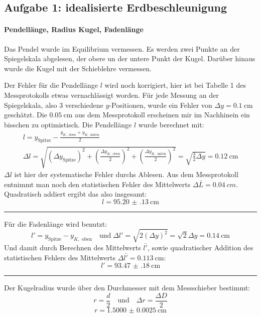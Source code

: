 
\subsection{Aufgabe 1: idealisierte Erdbeschleunigung}
\paragraph*{Pendellänge, Radius Kugel, Fadenlänge}
Das Pendel wurde im Equilibrium vermessen. Es werden zwei Punkte an der Spiegelskala abgelesen, der obere un der untere Punkt der Kugel. Darüber hinaus wurde die Kugel mit der Schieblehre vermessen. 

Der Fehler für die Pendellänge \(l\) wird noch korrigiert, hier ist bei Tabelle 1 des Messprotokolls etwas vernachlässigt worden. Für jede Messung an der Spiegelskala, also 3 verschiedene \(y\)-Positionen, wurde ein Fehler von \(\Delta y=\qty{0.1}{\cm}\) geschätzt. Die \(\qty{0.05}{\cm}\) aus dem Messprotokoll erscheinen mir im Nachhinein ein bisschen zu optimistisch. Die Pendellänge \(l\) wurde berechnet mit:
\begin{gather}
    l=y_{\text{Spitze}}-\frac{y_{K, \text{ oben}}+y_{K,\text{ unten}}}{2}\\
    \Delta l = \sqrt{(\Delta y_{\text{Spitze}})^2+\left(\frac{\Delta y_{K, \text{ oben}} }{2}\right)^2+\left(\frac{\Delta y_{K, \text{ unten}} }{2}\right)^2}=\sqrt{\frac{3}{2}\Delta y}=\qty{0.12}{\cm}
    \label{eq:fehler_l}
\end{gather} 
\(\Delta l\) ist hier der systematische Fehler durchs Ablesen. Aus dem Messprotokoll entnimmt man noch den statistischen Fehler des Mittelwerts \(\Delta \bar{L}=\qty{0.04}{cm}\). Quadratisch addiert ergibt das also insgesamt:
\[l=\qty{95.20(13)}{\cm}\]
\hrule \vspace{0.3cm}
Für die Fadenlänge wird benutzt:
\begin{equation}
    l'=y_{\text{Spitze}}-y_{K,\text{ oben}}\quad\text{und}\;\Delta l'=\sqrt{2(\Delta y)^2}=\sqrt{2}\Delta y=\qty{0.14}{\cm}
\end{equation}
Und damit durch Berechnen des Mittelwerts \(\bar{l'}\), sowie quadratischer Addition des statistischen Fehlers des Mittelwerts \(\Delta \bar{l'}=\qty{0.113}{\cm}\):
\[l'=\qty{93.47(18)}{\cm}\]
\hrule \vspace{0.3cm}
Der Kugelradius wurde über den Durchmesser mit dem Messschieber bestimmt:
\begin{equation}
    r=\frac{d}{2}\quad\text{und}\quad\Delta r=\frac{\Delta D}{2}
\end{equation}
\[r=\qty{1.5000(25)}{\cm}\]

